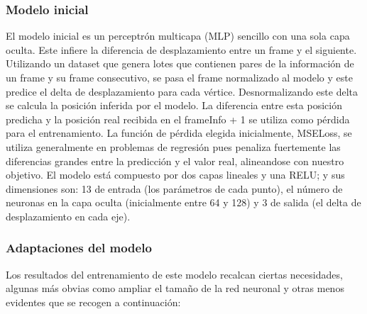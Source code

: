 \subsubsection{Modelo inicial}
El modelo inicial es un perceptrón multicapa (MLP) sencillo con una sola capa oculta. Este infiere la diferencia de desplazamiento entre un frame y el siguiente. Utilizando un dataset que genera lotes que contienen pares de la información de un frame y su frame consecutivo, se pasa el frame normalizado al modelo y este predice el delta de desplazamiento para cada vértice. Desnormalizando este delta se calcula la posición inferida por el modelo.  La diferencia entre esta posición predicha y la posición real recibida en el frameInfo + 1 se utiliza como pérdida para el entrenamiento. La función de pérdida elegida inicialmente, MSELoss, se utiliza generalmente en problemas de regresión pues penaliza fuertemente las diferencias grandes entre la predicción y el valor real, alineandose con nuestro objetivo. El modelo está compuesto por dos capas lineales y una RELU; y sus dimensiones son: 13 de entrada (los parámetros de cada punto), el número de neuronas en la capa oculta (inicialmente entre 64 y 128) y 3 de salida (el delta de desplazamiento en cada eje). \newline

\subsubsection{Adaptaciones del modelo}
Los resultados del entrenamiento de este modelo recalcan ciertas necesidades, algunas más obvias como ampliar el tamaño de la red neuronal y otras menos evidentes que se recogen a continuación:

